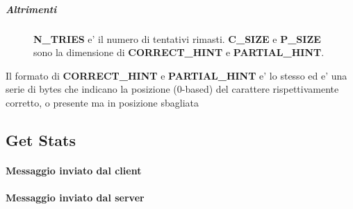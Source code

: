 \newpage

\subparagraph{Altrimenti}

\begin{lrbox}{\asciiart}
	\begin{varwidth}{\maxdimen}
		\noindent
	\end{varwidth}
\end{lrbox}%

\begin{center}
	\begin{figure}[h]
		\makebox[\textwidth]{\showasciiart{85ex}}
		\centering \textbf{N\_TRIES} e' il numero di tentativi rimasti. \textbf{C\_SIZE} e \textbf{P\_SIZE} sono la dimensione di \textbf{CORRECT\_HINT} e \textbf{PARTIAL\_HINT}.
	\end{figure}
\end{center}

Il formato di \textbf{CORRECT\_HINT} e \textbf{PARTIAL\_HINT} e' lo stesso ed e' una serie di bytes che indicano la posizione (0-based) del carattere rispettivamente corretto, o presente ma in posizione sbagliata


\subsection{Get Stats}

\paragraph{Messaggio inviato dal client}

\begin{lrbox}{\asciiart}
	\begin{varwidth}{\maxdimen}
		\noindent
	\end{varwidth}
\end{lrbox}%

\begin{center}
	\begin{figure}[h]
		\makebox[\textwidth]{\showasciiart{40ex}}
	\end{figure}
\end{center}

\paragraph{Messaggio inviato dal server}

\begin{lrbox}{\asciiart}
	\begin{varwidth}{\maxdimen}
		\noindent
	\end{varwidth}
\end{lrbox}%


